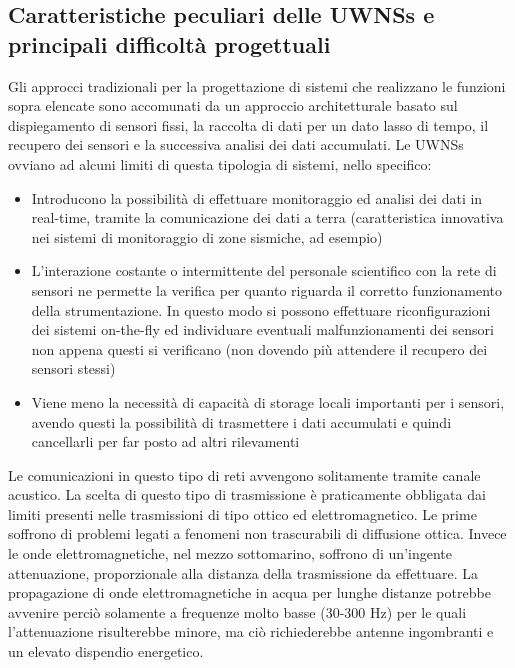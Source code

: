 \documentclass[Lau,binding=0.6cm]{sapthesis}
\begin{document}
\subsection{Caratteristiche peculiari delle UWNSs e principali difficoltà progettuali}
Gli approcci tradizionali per la progettazione di sistemi che realizzano le funzioni sopra elencate sono accomunati da un approccio architetturale basato sul dispiegamento di sensori fissi, la raccolta di dati per un dato lasso di tempo, il recupero dei sensori e la successiva analisi dei dati accumulati.\newline
Le UWNSs ovviano ad alcuni limiti di questa tipologia di sistemi, nello specifico: \newline
\begin{itemize}
\item Introducono la possibilità di effettuare monitoraggio ed analisi dei dati in real-time, tramite la comunicazione dei dati a terra (caratteristica innovativa nei sistemi di monitoraggio di zone sismiche, ad esempio)\newline
\item L'interazione costante o intermittente del personale scientifico con la rete di sensori ne permette la verifica per quanto riguarda il corretto funzionamento della strumentazione. \newline In questo modo si possono effettuare riconfigurazioni dei sistemi on-the-fly ed individuare eventuali malfunzionamenti dei sensori non appena questi si verificano (non dovendo più attendere il recupero dei sensori stessi)\newline
\item Viene meno la necessità di capacità di storage locali importanti per i sensori, avendo questi la possibilità di trasmettere i dati accumulati e quindi cancellarli per far posto ad altri rilevamenti
\end{itemize}
Le comunicazioni in questo tipo di reti avvengono solitamente tramite canale acustico. La scelta di questo tipo di trasmissione è praticamente obbligata dai limiti presenti nelle trasmissioni di tipo ottico ed elettromagnetico. Le prime soffrono di problemi legati a fenomeni non trascurabili di diffusione ottica.  Invece le onde elettromagnetiche, nel mezzo sottomarino, soffrono di un'ingente attenuazione, proporzionale alla distanza della trasmissione da effettuare. La propagazione di onde elettromagnetiche in acqua per lunghe distanze potrebbe avvenire perciò solamente a frequenze molto basse (30-300 Hz) per le quali l'attenuazione risulterebbe minore, ma ciò richiederebbe antenne ingombranti e un elevato dispendio energetico.
\end{document}
